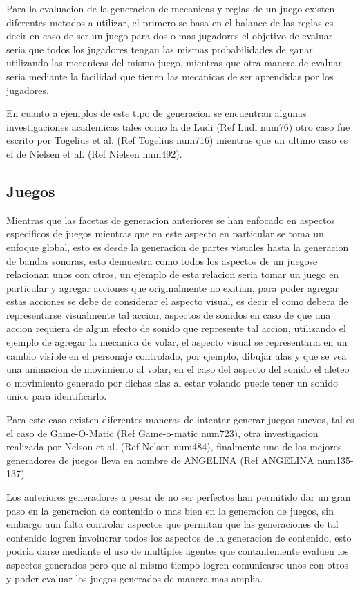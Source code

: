 Para la evaluacion de la generacion de mecanicas y reglas de un juego existen
diferentes metodos a utilizar, el primero se basa en el balance de las reglas es
decir en caso de ser un juego para dos o mas jugadores el objetivo de evaluar
seria que todos los jugadores tengan las mismas probabilidades de ganar
utilizando las mecanicas del mismo juego, mientras que otra manera de evaluar
seria mediante la facilidad que tienen las mecanicas de ser aprendidas por los
jugadores.

En cuanto a ejemplos de este tipo de generacion se encuentran algunas
investigaciones academicas tales como la de Ludi (Ref Ludi num76) otro caso fue
escrito por Togelius et al. (Ref Togelius num716) mientras que un ultimo caso es
el de Nielsen et al. (Ref Nielsen num492).

\subsection{Juegos}
\label{subsection:games}

Mientras que las facetas de generacion anteriores se han enfocado en aspectos
especificos de juegos mientras que en este aspecto en particular se toma un
enfoque global, esto es desde la generacion de partes visuales hasta la 
generacion de bandas sonoras, esto demuestra como todos los aspectos de un
juegose relacionan unos con otros, un ejemplo de esta relacion seria tomar un
juego en particular y agregar acciones que originalmente no exitian, para poder
agregar estas acciones se debe de considerar el aspecto visual, es decir el como
debera de representarse visualmente tal accion, aspectos de sonidos en caso de
que una accion requiera de algun efecto de sonido que represente tal accion,
utilizando el ejemplo de agregar la mecanica de volar, el aspecto visual se
representaria en un cambio visible en el personaje controlado, por ejemplo,
dibujar alas y que se vea una animacion de movimiento al volar, en el caso del
aspecto del sonido el aleteo o movimiento generado por dichas alas al estar
volando puede tener un sonido unico para identificarlo.

Para este caso existen diferentes maneras de intentar generar juegos nuevos, tal
es el caso de Game-O-Matic (Ref Game-o-matic num723), otra investigacion realizada
por Nelson et al. (Ref Nelson num484), finalmente uno de los mejores generadores
de juegos lleva en nombre de ANGELINA (Ref ANGELINA num135-137).

Los anteriores generadores a pesar de no ser perfectos han permitido dar un gran
paso en la generacion de contenido o mas bien en la generacion de juegos, sin
embargo aun falta controlar aspectos que permitan que las generaciones de tal
contenido logren involucrar todos los aspectos de la generacion de contenido,
esto podria darse mediante el uso de multiples agentes que contantemente evaluen
los aspectos generados pero que al mismo tiempo logren comunicarse unos con
otros y poder evaluar los juegos generados de manera mas amplia.

